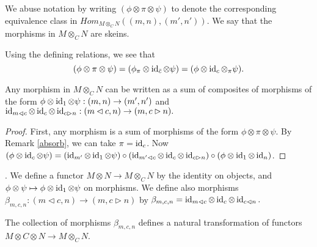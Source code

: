 \begin{remark}
 
We abuse notation by writing $(\phi\otimes\pi\otimes\psi)$ to denote the corresponding equivalence class in $Hom_{M\otimes_C N}((m,n),(m',n'))$. We say that the morphisms in $M\otimes_C N$ are skeins.\end{remark}


\begin{remark}\label{absorb}
  
  Using the defining relations, we see
  that
  \[
    (\phi\otimes\pi\otimes\psi) =
    (\phi_{\pi}\otimes\operatorname{id}_{\bar{c}}\otimes\psi) =
    (\phi\otimes\operatorname{id}_c\otimes{_{\pi}\psi}).
  \]
\end{remark}

\begin{lemma}\label{decompose}

  Any morphism in $M\otimes_C N$ can be written as a sum of composites of
  morphisms of the form $\phi\otimes\operatorname{id}_{1}\otimes\psi:(m,n)\to(m',n')$ and
  $\operatorname{id}_{m\lhd c}\otimes\operatorname{id}_c\otimes\operatorname{id}_{c\rhd n}:(m\lhd c,n)\to(m,c\rhd n).$
\end{lemma}

\begin{proof}
  First, any morphism is a sum of morphisms of the form
  $\phi\otimes\pi\otimes\psi$. By Remark \ref{absorb}, we can take
  $\pi=\operatorname{id}_c$. Now
  $(\phi\otimes\operatorname{id}_c\otimes\psi)
  =
  (\operatorname{id}_{m'}\otimes\operatorname{id}_1\otimes\psi)
  \circ
  (\operatorname{id}_{m'\lhd c}\otimes\operatorname{id}_c\otimes\operatorname{id}_{c\rhd n})
  \circ
  (\phi\otimes\operatorname{id}_1\otimes\operatorname{id}_n)$.
\end{proof}
    
\begin{definition}\label{definition/todo-unnamed-001}.
  We define a functor $M\otimes N\to M\otimes_C N$ by the identity on objects,
  and $\phi\otimes\psi\mapsto\phi\otimes\operatorname{id}_1\otimes\psi$ on morphisms. We
  define also morphisms $\beta_{m,c,n}:(m\lhd c,n)\to (m, c \rhd n)$ by
  $\beta_{m,c,n}=\operatorname{id}_{m\lhd c}\otimes\operatorname{id}_c\otimes\operatorname{id}_{c\lhd n}.$
\end{definition}

\begin{lemma}
  The collection of morphisms $\beta_{m,c,n}$ defines a natural transformation
  of functors $M\otimes C \otimes N\to M\otimes_C N$.
\end{lemma}


